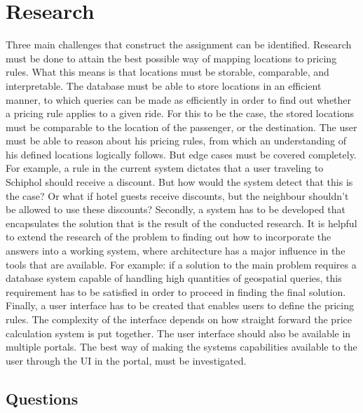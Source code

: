 \section{Research}
Three main challenges that construct the assignment can be identified. Research must be done to attain the best possible way of mapping locations to pricing rules. What this means is that locations must be storable, comparable, and interpretable. The database must be able to store locations in an efficient manner, to which queries can be made as efficiently in order to find out whether a pricing rule applies to a given ride. For this to be the case, the stored locations must be comparable to the location of the passenger, or the destination. The user must be able to reason about his pricing rules, from which an understanding of his defined locations logically follows. But edge cases must be covered completely. For example, a rule in the current system dictates that a user traveling to Schiphol should receive a discount. But how would the system detect that this is the case? Or what if hotel guests receive discounts, but the neighbour shouldn't be allowed to use these discounts? Secondly, a system has to be developed that encapsulates the solution that is the result of the conducted research. It is helpful to extend the research of the problem to finding out how to incorporate the answers into a working system, where architecture has a major influence in the tools that are available. For example: if a solution to the main problem requires a database system capable of handling high quantities of geospatial queries, this requirement has to be satisfied in order to proceed in finding the final solution. Finally, a user interface has to be created that enables users to define the pricing rules. The complexity of the interface depends on how straight forward the price calculation system is put together. The user interface should also be available in multiple portals. The best way of making the systems capabilities available to the user through the UI in the portal, must be investigated.

\subsection{Questions}

